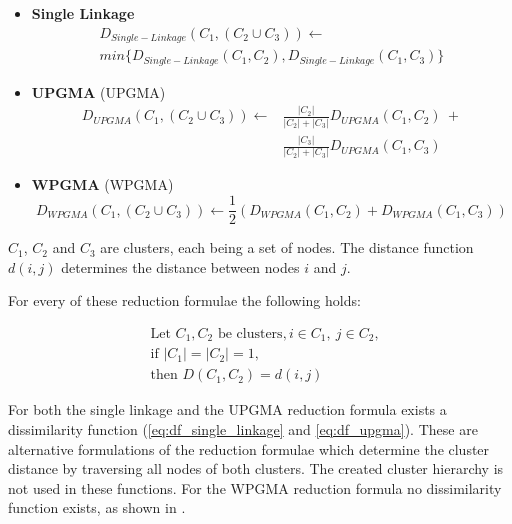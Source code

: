 \begin{itemize}
    \item \textbf{Single Linkage}
    \begin{multline}
    D_{Single-Linkage}(C_1, (C_2 \cup C_3)) \leftarrow \\
    min \{ D_{Single-Linkage}(C_1, C_2), D_{Single-Linkage}(C_1, C_3) \}
    \end{multline}
    \item \textbf{\acrshort{UPGMA}} (\acrlong{UPGMA})
    \begin{equation}
    \begin{split}
    D_{UPGMA}(C_1, (C_2 \cup C_3)) \leftarrow &\frac{|C_2|}{|C_2|+|C_3|}D_{UPGMA}(C_1, C_2)\ + \\ &\frac{|C_3|}{|C_2|+|C_3|}D_{UPGMA}(C_1, C_3)
    \end{split}
    \end{equation}
    \item \textbf{\acrshort{WPGMA}} (\acrlong{WPGMA})
    \begin{equation}
    D_{WPGMA}(C_1, (C_2 \cup C_3)) \leftarrow \frac{1}{2} (D_{WPGMA}(C_1, C_2) + D_{WPGMA}(C_1, C_3))
    \end{equation}
\end{itemize}

$C_1$, $C_2$ and $C_3$ are clusters, each being a set of nodes. The distance function $d(i, j)$ determines the distance between nodes $i$ and $j$.

For every of these reduction formulae the following holds:

\begin{equation}
\begin{split}
&\textrm{Let }C_1, C_2\textrm{ be clusters}, i \in C_1,\ j \in C_2, \\
&\textrm{if }|C_1| = |C_2| = 1, \\
&\textrm{then }D(C_1, C_2) = d(i, j)
\end{split}
\end{equation}

For both the single linkage and the \acrshort{UPGMA} reduction formula exists a dissimilarity function (\ref{eq:df_single_linkage} and \ref{eq:df_upgma}). These are alternative formulations of the reduction formulae which determine the cluster distance by traversing all nodes of both clusters. The created cluster hierarchy is not used in these functions. For the \acrshort{WPGMA} reduction formula no dissimilarity function exists, as shown in \cite{clustering:2007}.

